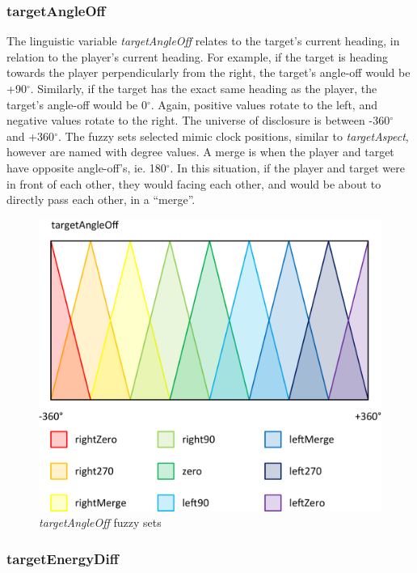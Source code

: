 \subsubsection{targetAngleOff}

The linguistic variable \emph{targetAngleOff} relates to the target's current heading, in relation to the player's current heading. For example, if the target is heading towards the player perpendicularly from the right, the target's angle-off would be +90$^{\circ}$. Similarly, if the target has the exact same heading as the player, the target's angle-off would be 0$^{\circ}$. Again, positive values rotate to the left, and negative values rotate to the right. The universe of disclosure is between -360$^{\circ}$ and +360$^{\circ}$. The fuzzy sets selected mimic clock positions, similar to \emph{targetAspect}, however are named with degree values. A merge is when the player and target have opposite angle-off's, ie. 180$^{\circ}$. In this situation, if the player and target were in front of each other, they would facing each other, and would be about to directly pass each other, in a ``merge''.

\begin{figure}[H]
\centering
\caption{\emph{targetAngleOff} fuzzy sets}
\includegraphics[scale=0.08]{./img/pdf/targetAngleOffSets.pdf}
\end{figure}

\subsubsection{targetEnergyDiff}

